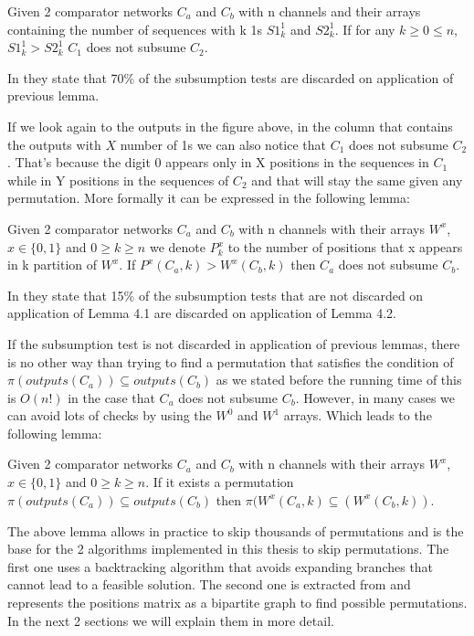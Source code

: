 \documentclass[../main.tex]{subfiles}
\begin{document}
	\begin{lemma}
		Given 2 comparator networks $C_a$ and $C_b$ with n channels and their arrays containing the number of sequences with k 1s $S1^{1}_k$ and $S2^{1}_k$. If for any $k\geq 0 \leq n$, $S1^{1}_k > S2^{1}_k$ $C_1$ does not subsume $C_2$.
	\end{lemma}
	
	In \cite{sortingnineinputs} they state that 70\% of the subsumption tests are discarded on application of previous lemma.
	
	If we look again to the outputs in the figure above, in the column that contains the outputs with $X$ number of 1s we can also notice that $C_1$ does not subsume $C_2$. That's because the digit 0 appears only in X positions in the sequences in $C_1$ while in Y positions in the sequences of $C_2$ and that will stay the same given any permutation. More formally it can be expressed in the following lemma:
	
	\begin{lemma}
		Given 2 comparator networks $C_a$ and $C_b$ with n channels with their arrays $W^x$, $x \in \{0,1\}$ and $0\geq k \geq n$ we denote $P{^x_k}$ to the number of positions that x appears in k partition of $W^x$. If $P^x(C_a, k) > W^x(C_b, k)$ then $C_a$ does not subsume $C_b$.
	\end{lemma}
	
	In \cite{sortingnineinputs} they state that 15\% of the subsumption tests that are not discarded on application of Lemma 4.1 are discarded on application of Lemma 4.2.
	
	If the subsumption test is not discarded in application of previous lemmas, there is no other way than trying to find a permutation that satisfies the condition of $\pi(outputs(C_a)) \subseteq outputs(C_b)$ as we stated before the running time of this is $O(n!)$ in the case that $C_a$ does not subsume $C_b$. However, in many cases we can avoid lots of checks by using the $W^0$ and $W^1$ arrays. Which leads to the following lemma:
	
	\begin{lemma}
		Given 2 comparator networks $C_a$ and $C_b$ with n channels with their arrays $W^x$, $x \in \{0,1\}$ and $0\geq k \geq n$. If it exists a permutation $\pi(outputs(C_a)) \subseteq outputs(C_b)$ then $\pi(W^x(C_a, k) \subseteq (W^x(C_b, k))$.
	\end{lemma}
	
	The above lemma allows in practice to skip thousands of permutations and is the base for the 2 algorithms implemented in this thesis to skip permutations. The first one uses a backtracking algorithm that avoids expanding branches that cannot lead to a feasible solution. The second one is extracted from \cite{improvedSubsumption} and represents the positions matrix as a bipartite graph to find possible permutations. In the next 2 sections we will explain them in more detail.
	
\end{document}

